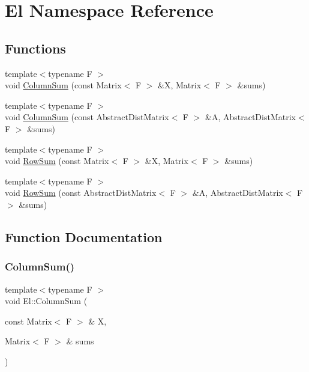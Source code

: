 \hypertarget{namespaceEl}{}\section{El Namespace Reference}
\label{namespaceEl}
\subsection*{Functions}
\begin{DoxyCompactItemize}
\item 
{\footnotesize template$<$typename F $>$ }\\void \hyperlink{namespaceEl_a09d5c471681b2b48fbe4c5e6bfd0b3d3}{Column\+Sum} (const Matrix$<$ F $>$ \&X, Matrix$<$ F $>$ \&sums)
\item 
{\footnotesize template$<$typename F $>$ }\\void \hyperlink{namespaceEl_ad446b5d330cc5ae121cc2eef632c4118}{Column\+Sum} (const Abstract\+Dist\+Matrix$<$ F $>$ \&A, Abstract\+Dist\+Matrix$<$ F $>$ \&sums)
\item 
{\footnotesize template$<$typename F $>$ }\\void \hyperlink{namespaceEl_a584f088a3325a8222d4d6ac37be04b04}{Row\+Sum} (const Matrix$<$ F $>$ \&X, Matrix$<$ F $>$ \&sums)
\item 
{\footnotesize template$<$typename F $>$ }\\void \hyperlink{namespaceEl_a3982e90cd0f7cbfdc0f19741ce254c1a}{Row\+Sum} (const Abstract\+Dist\+Matrix$<$ F $>$ \&A, Abstract\+Dist\+Matrix$<$ F $>$ \&sums)
\end{DoxyCompactItemize}


\subsection{Function Documentation}
\mbox{\label{namespaceEl_a09d5c471681b2b48fbe4c5e6bfd0b3d3}} 
\subsubsection{\texorpdfstring{Column\+Sum()}{ColumnSum()}\hspace{0.1cm}{\footnotesize\ttfamily [1/2]}}
{\footnotesize\ttfamily template$<$typename F $>$ \\
void El\+::\+Column\+Sum (\begin{DoxyParamCaption}\item[{const Matrix$<$ F $>$ \&}]{X,  }\item[{Matrix$<$ F $>$ \&}]{sums }\end{DoxyParamCaption})}




